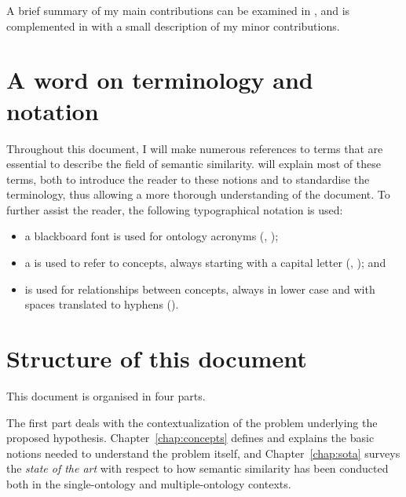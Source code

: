 A brief summary of my main contributions can be examined in , and is complemented in  with a small description of my minor contributions.


\section{A word on terminology and notation} \label{sec:intro/notation}

Throughout this document, I will make numerous references to terms that are essential to describe the field of semantic similarity.  will explain most of these terms, both to introduce the reader to these notions and to standardise the terminology, thus allowing a more thorough understanding of the document. To further assist the reader, the following typographical notation is used:
\begin{itemize}
    \item a blackboard font is used for ontology acronyms (\eg {}, );
    \item a  is used to refer to concepts, always starting with a capital letter (\eg {}, ); and
    \item {} is used for relationships between concepts, always in lower case and with spaces translated to hyphens (\eg {}).
\end{itemize}


\section{Structure of this document} \label{sec:intro/structure}

This document is organised in four parts.

The first part deals with the contextualization of the problem underlying the proposed hypothesis. Chapter~\ref{chap:concepts} defines and explains the basic notions needed to understand the problem itself, and Chapter~\ref{chap:sota} surveys the \emph{state of the art} with respect to how semantic similarity has been conducted both in the single-ontology and multiple-ontology contexts.

